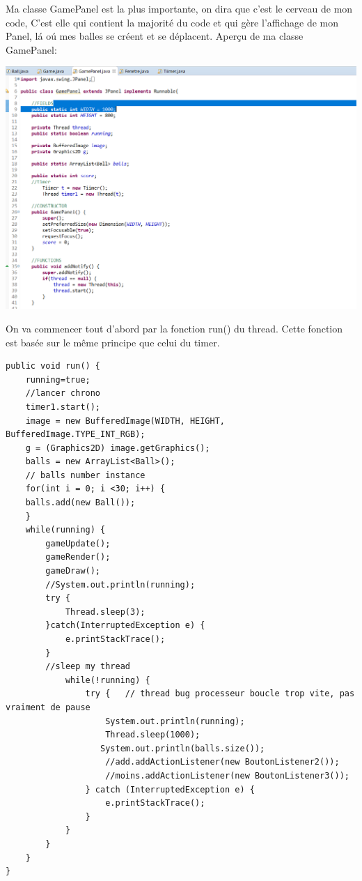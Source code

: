 \documentclass{article}
\begin{document}
Ma classe GamePanel est la plus importante, on dira que c'est le cerveau de mon code, C'est elle qui contient la majorité du code et qui gère l'affichage de mon Panel, l\'a o\'u mes balles se créent et se déplacent.\vspace{5mm} \newline
Aperçu de ma classe GamePanel:
\begin{center}
  \includegraphics[scale=0.6]{GamePanelApercu.png}
\end{center}

On va commencer tout d'abord par la fonction run() du thread. Cette fonction est basée sur le même principe que celui du timer.

\begin{verbatim}
public void run() {
    running=true;
    //lancer chrono
    timer1.start();
    image = new BufferedImage(WIDTH, HEIGHT, BufferedImage.TYPE_INT_RGB);
    g = (Graphics2D) image.getGraphics();
    balls = new ArrayList<Ball>();
    // balls number instance
    for(int i = 0; i <30; i++) {
    balls.add(new Ball());
    }
    while(running) {
        gameUpdate();
        gameRender();
        gameDraw();
        //System.out.println(running);
        try {
            Thread.sleep(3);
        }catch(InterruptedException e) {
            e.printStackTrace();
        }
        //sleep my thread
            while(!running) {
                try {   // thread bug processeur boucle trop vite, pas vraiment de pause
                    System.out.println(running);
                    Thread.sleep(1000);
                   System.out.println(balls.size());
                    //add.addActionListener(new BoutonListener2());
                    //moins.addActionListener(new BoutonListener3());
                } catch (InterruptedException e) {
                    e.printStackTrace();
                }
            }
        }
    }
}
\end{verbatim}
\end{document}

